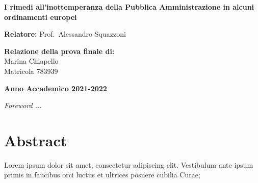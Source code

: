 \documentclass[12pt,it,a4paper,]{report}
\begin{document}
\begin{titlepage}
        \vspace{10mm}
        
      	\begin{center}
            {\LARGE{
                    \textbf{I rimedi all'inottemperanza della Pubblica
Amministrazione in alcuni ordinamenti europei}
                    \par
            }}
        \end{center}

        
        \vspace{8mm}

        \noindent
        {\large \textbf{Relatore:}  Prof.~Alessandro Squazzoni } \\

        \vspace{5mm}

        \begin{flushright}
            {\large \textbf{Relazione della prova finale di:}} \\
            \large{Marina Chiapello} \\
            \large{Matricola 783939} 
        \end{flushright}
        
        \vspace{5mm}
        \begin{center}
            {\large{\bf Anno Accademico 2021-2022}}
        \end{center}

        \restoregeometry
        
    \end{titlepage}




\vspace*{\fill}

\noindent \textit{
Foreword ...
} \vspace*{\fill}  \newpage

\hypertarget{abstract}{%
\chapter*{Abstract}\label{abstract}}

Lorem ipsum dolor sit amet, consectetur adipiscing elit. Vestibulum ante
ipsum primis in faucibus orci luctus et ultrices posuere cubilia Curae;
\end{document}
